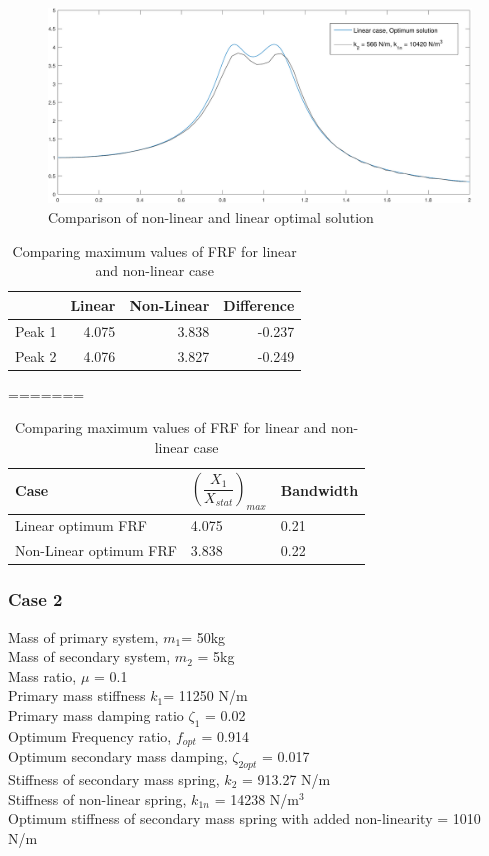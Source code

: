 \begin{figure}[h!]
\includegraphics[width=\textwidth, height = 0.5\textwidth]{"figures/2comparing"}
\caption{Comparison of non-linear and linear optimal solution}
\end{figure}

\begin{table}[h!]
\centering
\begin{tabular}{|r|r|r|r|}
\hline
 & Linear & Non-Linear & Difference \\ \hline
Peak 1& 4.075 & 3.838 & -0.237\\
Peak 2 & 4.076  & 3.827 & -0.249\\ \hline
\end{tabular}
\caption{Comparing maximum values of FRF for linear and non-linear case}
=======
\begin{tabular}{|m{6cm}|m{2cm}|m{2cm}|}
\hline
Case& $\left(\dfrac{X_{1}}{X_{stat}}\right)_{max}$ & Bandwidth \\
\hline
Linear optimum FRF & 4.075 & 0.21 

\\
\hline
Non-Linear optimum FRF & 3.838 & 0.22

 \\ 
\hline
\end{tabular}
\end{table}

\subsubsection{Case 2}
Mass of primary system, $m_1$= 50kg\\
Mass of secondary system, $m_2$ = 5kg\\
Mass ratio, $\mu$ = 0.1\\
Primary mass stiffness $k_1$= 11250 N/m\\
Primary mass damping ratio $\zeta_1$ = 0.02\\
Optimum Frequency ratio, $f_{opt}$ = 0.914\\
Optimum secondary mass damping, $\zeta_{2opt}$ = 0.017\\
Stiffness of secondary mass spring, $k_2$ = 913.27 N/m \\
Stiffness of non-linear spring, $k_{1n}$ = 14238 N/m$^3$\\
Optimum stiffness of secondary mass spring with added non-linearity = 1010 N/m

